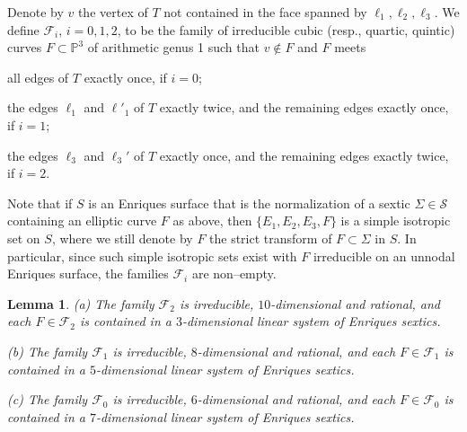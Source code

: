 \documentclass[11pt]{amsart}
\newtheorem{lemma}[thm]{Lemma}
\theoremstyle{definition}
\def\PP{{\mathbb P}}
\def\F{{\mathcal F}}
\begin{document}
 Denote by $v$ the vertex of $T$ not contained
in the face spanned by $\ell_1,\ell_2,\ell_3$.
We define  $\F_i$, $i=0,1,2$,  to be  the family of \color{black} irreducible \color{black} cubic  (resp., quartic, quintic) curves $F \subset \PP^3$ \color{black} of arithmetic genus 1 \color{black} such that $v \not \in F$ and $F$ meets\\ 
\begin{inparaenum}
\item [$\bullet$] all edges of $T$ exactly once, if $i=0$;\\
\item [$\bullet$]  the edges $\ell_1$ and $\ell'_1$ of $T$ exactly twice, and the remaining edges exactly once, if $i=1$;\\
\item [$\bullet$] the edges $\ell_3$ and $\ell_3'$ of $T$ exactly once, and the remaining edges exactly twice, if $i=2$.
\end{inparaenum}

\color{black} Note that if $S$ is an Enriques surface that is
the normalization of a sextic $\Sigma \in \mathcal{S}$ containing an
elliptic curve $F$ as above,
then $\{E_1,E_2,E_3, F\}$ is a simple isotropic set on $S$,
where we still denote by $F$ the strict transform of $F\subset \Sigma$
in $S$. \color{black} In particular, since such simple isotropic sets exist with $F$ irreducible on an unnodal Enriques surface, the families $\F_i$ are non--empty. 
\color{black}


\begin{lemma} \label{lemma:irr+solouna}
(a) The family $\F_2$ is irreducible, $10$-dimensional and rational, and each $F \in \F_2$ is contained in a $3$-dimensional linear system of Enriques sextics.

(b) The family $\F_1$ is irreducible, $8$-dimensional and rational, and each $F \in \F_1$ is contained in a $5$-dimensional linear system of Enriques sextics.

(c) The family $\F_0$ is irreducible, $6$-dimensional and rational, and each $F \in \F_0$ is contained in a $7$-dimensional linear system of Enriques sextics.
\end{lemma}
\end{document}
